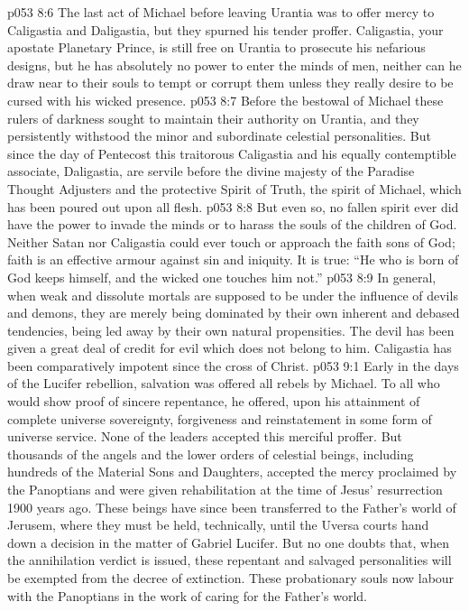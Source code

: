 \vs p053 8:6 \pc The last act of Michael before leaving Urantia was to offer mercy to Caligastia and Daligastia, but they spurned his tender proffer. Caligastia, your apostate Planetary Prince, is still free on Urantia to prosecute his nefarious designs, but he has absolutely no power to enter the minds of men, neither can he draw near to their souls to tempt or corrupt them unless they really desire to be cursed with his wicked presence.
\vs p053 8:7 \pc Before the bestowal of Michael these rulers of darkness sought to maintain their authority on Urantia, and they persistently withstood the minor and subordinate celestial personalities. But since the day of Pentecost this traitorous Caligastia and his equally contemptible associate, Daligastia, are servile before the divine majesty of the Paradise Thought Adjusters and the protective Spirit of Truth, the spirit of Michael, which has been poured out upon all flesh.
\vs p053 8:8 But even so, no fallen spirit ever did have the power to invade the minds or to harass the souls of the children of God. Neither Satan nor Caligastia could ever touch or approach the faith sons of God; faith is an effective armour against sin and iniquity. It is true: “He who is born of God keeps himself, and the wicked one touches him not.”
\vs p053 8:9 In general, when weak and dissolute mortals are supposed to be under the influence of devils and demons, they are merely being dominated by their own inherent and debased tendencies, being led away by their own natural propensities. The devil has been given a great deal of credit for evil which does not belong to him. Caligastia has been comparatively impotent since the cross of Christ.
\vs p053 9:1 Early in the days of the Lucifer rebellion, salvation was offered all rebels by Michael. To all who would show proof of sincere repentance, he offered, upon his attainment of complete universe sovereignty, forgiveness and reinstatement in some form of universe service. None of the leaders accepted this merciful proffer. But thousands of the angels and the lower orders of celestial beings, including hundreds of the Material Sons and Daughters, accepted the mercy proclaimed by the Panoptians and were given rehabilitation at the time of Jesus’ resurrection 1900 years ago. These beings have since been transferred to the Father’s world of Jerusem, where they must be held, technically, until the Uversa courts hand down a decision in the matter of Gabriel  Lucifer. But no one doubts that, when the annihilation verdict is issued, these repentant and salvaged personalities will be exempted from the decree of extinction. These probationary souls now labour with the Panoptians in the work of caring for the Father’s world.
